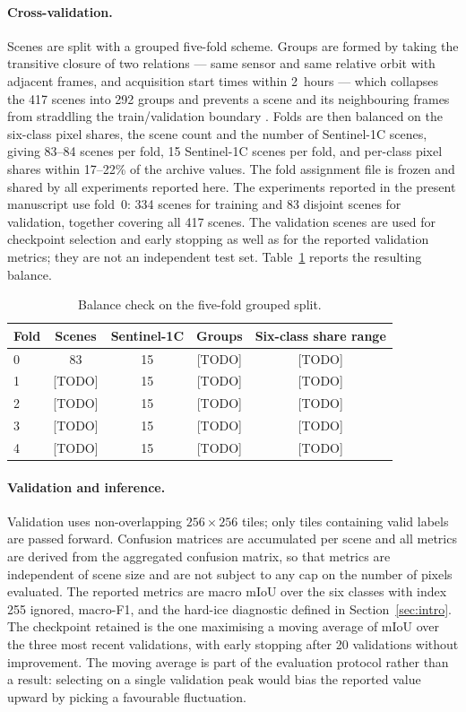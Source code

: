 \documentclass[preprint,12pt,authoryear]{elsarticle}
\begin{document}
\paragraph{Cross-validation.} Scenes are split with a grouped five-fold scheme.
Groups are formed by taking the transitive closure of two relations --- same
sensor and same relative orbit with adjacent frames, and acquisition start times
within 2~hours --- which collapses the 417 scenes into 292 groups and prevents
a scene and its neighbouring frames from straddling the train/validation
boundary \citep{roberts2017crossvalidation}. Folds are then balanced on the
six-class pixel shares, the scene count and the number of Sentinel-1C scenes,
giving 83--84 scenes per fold, 15 Sentinel-1C scenes per fold, and per-class
pixel shares within 17--22\% of the archive values. The fold assignment file is
frozen and shared by all experiments reported here. The experiments reported
in the present manuscript use fold~0: 334 scenes for training and 83 disjoint
scenes for validation, together covering all 417 scenes. The validation scenes
are used for checkpoint selection and early stopping as well as for the
reported validation metrics; they are not an independent test set. Table~\ref{tab:folds}
reports the resulting balance.

\begin{table}[t]
\centering
\caption{Balance check on the five-fold grouped split.}
\label{tab:folds}
\begin{tabular}{lcccc}
\toprule
Fold & Scenes & Sentinel-1C & Groups & Six-class share range \\
\midrule
0 & 83 & 15 & [TODO] & [TODO] \\
1 & [TODO] & 15 & [TODO] & [TODO] \\
2 & [TODO] & 15 & [TODO] & [TODO] \\
3 & [TODO] & 15 & [TODO] & [TODO] \\
4 & [TODO] & 15 & [TODO] & [TODO] \\
\bottomrule
\end{tabular}
\end{table}

\paragraph{Validation and inference.} Validation uses non-overlapping
$256\times256$ tiles; only tiles containing valid labels are passed forward.
Confusion matrices are accumulated per scene and all metrics are derived from
the aggregated confusion matrix, so that metrics are independent of scene size
and are not subject to any cap on the number of pixels evaluated. The reported
metrics are macro mIoU over the six classes with index 255 ignored, macro-F1,
and the hard-ice diagnostic defined in Section~\ref{sec:intro}. The checkpoint
retained is the one maximising a moving average of mIoU over the three most
recent validations, with early stopping after 20 validations without
improvement. The moving average is part of the evaluation protocol rather than a
result: selecting on a single validation peak would bias the reported value
upward by picking a favourable fluctuation.
\end{document}
